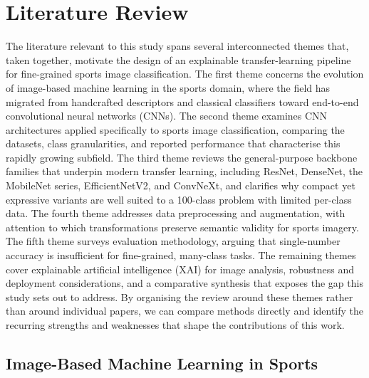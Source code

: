 \section{Literature Review}
\label{sec:litreview}

The literature relevant to this study spans several interconnected themes that, taken together, motivate the design of an explainable transfer-learning pipeline for fine-grained sports image classification.
The first theme concerns the evolution of image-based machine learning in the sports domain, where the field has migrated from handcrafted descriptors and classical classifiers toward end-to-end convolutional neural networks (CNNs).
The second theme examines CNN architectures applied specifically to sports image classification, comparing the datasets, class granularities, and reported performance that characterise this rapidly growing subfield.
The third theme reviews the general-purpose backbone families that underpin modern transfer learning, including ResNet, DenseNet, the MobileNet series, EfficientNetV2, and ConvNeXt, and clarifies why compact yet expressive variants are well suited to a 100-class problem with limited per-class data.
The fourth theme addresses data preprocessing and augmentation, with attention to which transformations preserve semantic validity for sports imagery.
The fifth theme surveys evaluation methodology, arguing that single-number accuracy is insufficient for fine-grained, many-class tasks.
The remaining themes cover explainable artificial intelligence (XAI) for image analysis, robustness and deployment considerations, and a comparative synthesis that exposes the gap this study sets out to address.
By organising the review around these themes rather than around individual papers, we can compare methods directly and identify the recurring strengths and weaknesses that shape the contributions of this work.

\subsection{Image-Based Machine Learning in Sports}
\label{subsec:imagemlsports}

